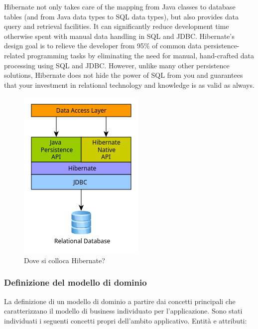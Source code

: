 \documentclass[a4paper,11pt]{article}
\begin{document}
Hibernate not only takes care of the mapping from Java classes to database tables (and from Java data types to SQL data types), but also provides data query and retrieval facilities. It can significantly reduce development time otherwise spent with manual data handling in SQL and JDBC. Hibernate’s design goal is to relieve the developer from 95\% of common data persistence-related programming tasks by eliminating the need for manual, hand-crafted data processing using SQL and JDBC. However, unlike many other persistence solutions, Hibernate does not hide the power of SQL from you and guarantees that your investment in relational technology and knowledge is as valid as always. \cite{jbossHibernateUser}

\begin{figure}[H]
  \centering
  \includegraphics[width=0.4\linewidth]{img/image-3.png}
  \caption{Dove si colloca Hibernate? \cite{jbossHibernateUserArch}}
  \label{fig:architetturahibernate}
\end{figure}


\subsubsection{Definizione del modello di dominio}\label{modellodominio}

La definizione di un modello di dominio a partire dai concetti principali che caratterizzano il modello di business individuato per l'applicazione.
Sono stati individuati i seguenti concetti propri dell'ambito applicativo.
Entità e attributi:
\end{document}
